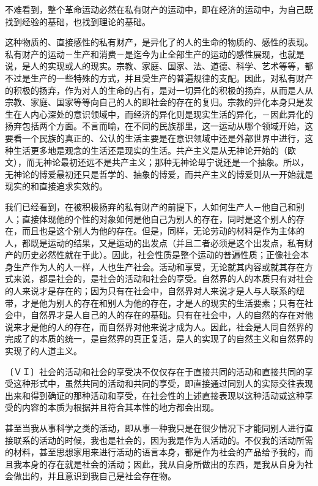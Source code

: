 \documentclass[a4paper,twoside,12pt,AutoFakeBold]{ctexart}
\begin{document}
不难看到，整个革命运动必然在私有财产的运动中，即在经济的运动中，为自己既找到经验的基础，也找到理论的基础。

这种物质的、直接感性的私有财产，是异化了的人的生命的物质的、感性的表现。私有财产的运动－生产和消费－是迄今为止全部生产的运动的感性展现，也就是说，是人的实现或人的现实。宗教、家庭、国家、法、道德、科学、艺术等等，都不过是生产的一些特殊的方式，并且受生产的普遍规律的支配。因此，对私有财产的积极的扬弃，作为对人的生命的占有，是对一切异化的积极的扬弃，从而是人从宗教、家庭、国家等等向自己的人的即社会的存在的复归。宗教的异化本身只是发生在人内心深处的意识领域中，而经济的异化则是现实生活的异化，－因此异化的扬弃包括两个方面。不言而喻，在不同的民族那里，这一运动从哪个领域开始，这要看一个民族的真正的、公认的生活主要是在意识领域中还是外部世界中进行，这种生活更多地是观念的生活还是现实的生活。共产主义是从无神论开始的（欧文），而无神论最初还远不是共产主义；那种无神论毋宁说还是一个抽象。所以，无神论的博爱最初还只是哲学的、抽象的博爱，而共产主义的博爱则从一开始就是现实的和直接追求实效的。

我们已经看到，在被积极扬弃的私有财产的前提下，人如何生产人－他自己和别人；直接体现他的个性的对象如何是他自己为别人的存在，同时是这个别人的存在，而且也是这个别人为他的存在。但是，同样，无论劳动的材料是作为主体的人，都既是运动的结果，又是运动的出发点（并且二者必须是这个出发点，私有财产的历史必然性就在于此）。因此，社会性质是整个运动的普遍性质；正像社会本身生产作为人的人一样，人也生产社会。活动和享受，无论就其内容或就其存在方式来说，都是社会的，是社会的活动和社会的享受。自然界的人的本质只有对社会的人来说才是存在的；因为只有在社会中，自然界对人来说才是人与人联系的纽带，才是他为别人的存在和别人为他的存在，才是人的现实的生活要素；只有在社会中，自然界才是人自己的人的存在的基础。只有在社会中，人的自然的存在对他说来才是他的人的存在，而自然界对他来说才成为人。因此，社会是人同自然界的完成了的本质的统一，是自然界的真正复活，是人的实现了的自然主义和自然界的实现了的人道主义。

〔ＶＩ〕社会的活动和社会的享受决不仅仅存在于直接共同的活动和直接共同的享受这种形式中，虽然共同的活动和共同的享受，即直接通过同别人的实际交往表现出来和得到确证的那种活动和享受，在社会性的上述直接表现以这种活动或这种享受的内容的本质为根据并且符合其本性的地方都会出现。

甚至当我从事科学之类的活动，即从事一种我只是在很少情况下才能同别人进行直接联系的活动的时候，我也是社会的，因为我是作为人活动的。不仅我的活动所需的材料，甚至思想家用来进行活动的语言本身，都是作为社会的产品给予我的，而且我本身的存在就是社会的活动；因此，我从自身所做出的东西，是我从自身为社会做出的，并且意识到我自己是社会存在物。
\end{document}
